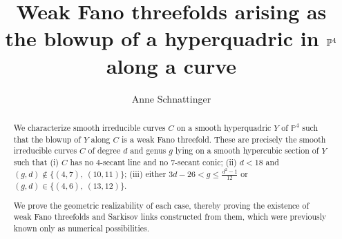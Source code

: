 \documentclass[english,11pt,reqno]{amsart}
\title[Weak Fano threefolds arising as the blowup of a quadric along a curve]{Weak Fano threefolds arising as the blowup of a hyperquadric in \texorpdfstring{$\Pfour$}{P4} along a curve}
\author{Anne Schnattinger}
\date{}
\newcommand{\Pfour}{\mathbb{P}^4}
\begin{document}
	\maketitle
	\begin{abstract}
		We characterize smooth irreducible curves $C$ on a smooth hyperquadric $Y$ of $\Pfour$ such that the blowup of $Y$ along $C$ is a weak Fano threefold. These are precisely the smooth irreducible curves $C$ of degree $d$ and genus $g$ lying on a smooth hypercubic section of $Y$ such
		that (i) $C$ has no 4-secant line and no 7-secant conic; (ii) $d< 18$ and $(g,d)\not \in \{(4,7),\:(10, 11)\}$; (iii) either $3d-26<g\leq\frac{d^2-1}{12}$ or $(g,d)\in \{(4,6),\:(13,12)\}$. \par We prove the geometric realizability of each case, thereby proving the existence of weak Fano threefolds and Sarkisov links constructed from them, which were previously known only as numerical possibilities.
	\end{abstract}
	\tableofcontents
\end{document}

